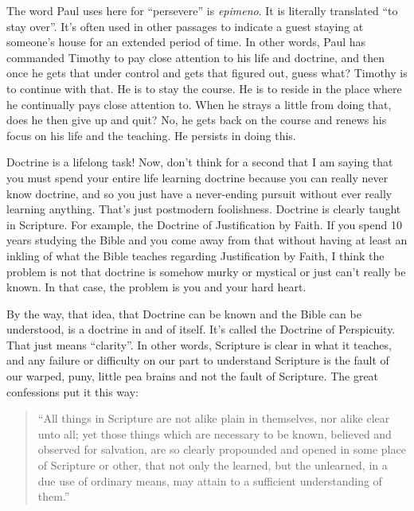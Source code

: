 \documentclass[letterpaper, 12pt]{article}
\begin{document}
    The word Paul uses here for ``persevere'' is \emph{epimeno}. It
    is literally translated ``to stay over''. It's often used in other
    passages to indicate a guest staying at someone's house for an
    extended period of time. In other words, Paul has commanded Timothy
    to pay close attention to his life and doctrine, and then once he
    gets that under control and gets that figured out, guess what?
    Timothy is to continue with that. He is to stay the course. He is to
    reside in the place where he continually pays close attention to.
    When he strays a little from doing that, does he then give up and
    quit? No, he gets back on the course and renews his focus on his
    life and the teaching. He persists in doing this. 

    Doctrine is a lifelong task! Now, don't think for a second that I am
    saying that you must spend your entire life learning doctrine
    because you can really never know doctrine, and so you just have a
    never-ending pursuit without ever really learning anything. That's
    just postmodern foolishness. Doctrine is clearly taught in
    Scripture. For example, the Doctrine of Justification by Faith. If
    you spend 10 years studying the Bible and you come away from that
    without having at least an inkling of what the Bible teaches
    regarding Justification by Faith, I think the problem is not that
    doctrine is somehow murky or mystical or just can't really be known.
    In that case, the problem is you and your hard heart.

    By the way, that idea, that Doctrine can be known and the Bible can
    be understood, is a doctrine in and of itself. It's called the
    Doctrine of Perspicuity. That just means ``clarity''. In other
    words, Scripture is clear in what it teaches, and any failure or
    difficulty on our part to understand Scripture is the fault of our
    warped, puny, little pea brains and not the fault of Scripture. The
    great confessions put it this way:

    \begin{quote}

        ``All things in Scripture are not alike plain in themselves, nor
        alike clear unto all; yet those things which are necessary to be
        known, believed and observed for salvation, are so clearly
        propounded and opened in some place of Scripture or other, that
        not only the learned, but the unlearned, in a due use of
        ordinary means, may attain to a sufficient understanding of
        them.''

    \end{quote}
\end{document}
